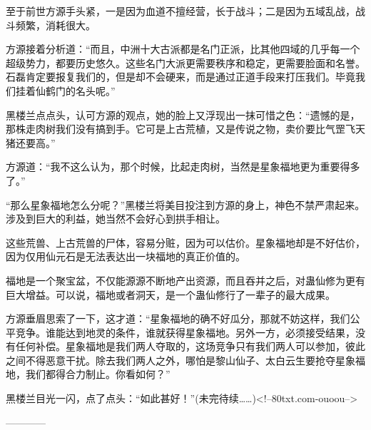 \begin{this_body}
至于前世方源手头紧，一是因为血道不擅经营，长于战斗；二是因为五域乱战，战斗频繁，消耗很大。

方源接着分析道：“而且，中洲十大古派都是名门正派，比其他四域的几乎每一个超级势力，都要历史悠久。这些名门大派更需要秩序和稳定，更需要脸面和名誉。石磊肯定要报复我们的，但是却不会硬来，而是通过正道手段来打压我们。毕竟我们挂着仙鹤门的名头呢。”

黑楼兰点点头，认可方源的观点，她的脸上又浮现出一抹可惜之色：“遗憾的是，那株走肉树我们没有搞到手。它可是上古荒植，又是传说之物，卖价要比气罡飞天猪还要高。”

方源道：“我不这么认为，那个时候，比起走肉树，当然是星象福地更为重要得多了。”

“那么星象福地怎么分呢？”黑楼兰将美目投注到方源的身上，神色不禁严肃起来。涉及到巨大的利益，她当然不会好心到拱手相让。

这些荒兽、上古荒兽的尸体，容易分赃，因为可以估价。星象福地却是不好估价，因为仅用仙元石是无法表达出一块福地的真正价值的。

福地是一个聚宝盆，不仅能源源不断地产出资源，而且吞并之后，对蛊仙修为更有巨大增益。可以说，福地或者洞天，是一个蛊仙修行了一辈子的最大成果。

方源垂眉思索了一下，这才道：“星象福地的确不好瓜分，那就不妨这样，我们公平竞争。谁能达到地灵的条件，谁就获得星象福地。另外一方，必须接受结果，没有任何补偿。星象福地是我们两人夺取的，这场竞争只有我们两人可以参加，彼此之间不得恶意干扰。除去我们两人之外，哪怕是黎山仙子、太白云生要抢夺星象福地，我们都得合力制止。你看如何？”

黑楼兰目光一闪，点了点头：“如此甚好！”(未完待续……)<!--80txt.com-ouoou-->

------------

\end{this_body}


